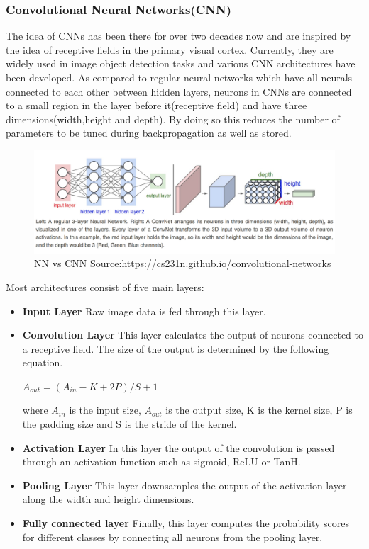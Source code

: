 \subsubsection*{Convolutional Neural Networks(CNN)}
The idea of CNNs has been there for over two decades now and are inspired by the idea of receptive fields in the primary visual cortex. Currently, they are widely used in image object detection tasks and various CNN architectures have been developed. As compared to regular neural networks which have all neurals connected to each other between hidden layers, neurons in CNNs are connected to a small region in the layer before it(receptive field) and have three dimensions(width,height and depth). By doing so this reduces the number of parameters to be tuned during backpropagation as well as stored. 
\begin{figure}[h]
	\centering 
	\includegraphics[width=\linewidth]{images/neuralnet}
	\caption{NN vs CNN Source:\url{https://cs231n.github.io/convolutional-networks}}
	\label{fig:cnn}
\end{figure}


Most architectures consist of five main layers:
\begin{itemize}[noitemsep]
	\item  \textbf{Input Layer} Raw image data is fed through this layer. 
	\item  \textbf{Convolution Layer} This layer calculates the output of neurons connected to a receptive field.
	The size of the output is determined by the following equation. 
	
	$A_{out}= (A_{in}-K+2P)/S+1$
	
	where $A_{in}$ is the input size,  $A_{out}$ is the output size, K is the kernel size, P is the padding size and S is the stride of the kernel. 
	\item  \textbf{Activation Layer} In this layer the output of the convolution is passed through an activation function such as sigmoid, ReLU or TanH. 
	\item  \textbf{Pooling Layer} This layer downsamples the  output of the activation layer along the width and height dimensions. 
	\item \textbf{Fully connected layer} Finally, this layer computes the probability scores for different classes by connecting all neurons from the pooling layer. 
\end{itemize}


